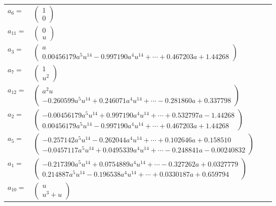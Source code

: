 \documentclass[1p]{elsarticle_modified}
\theoremstyle{definition}
\begin{document}
\begin{tabular}{m{7pt} m{180pt} m{7pt} m{180pt} }
\flushright $a_{6}=$&$\begin{pmatrix}1\\0\end{pmatrix}$ \\
\flushright $a_{11}=$&$\begin{pmatrix}0\\u\end{pmatrix}$ \\
\flushright $a_{3}=$&$\begin{pmatrix}a\\0.00456179 a^{5} u^{14}-0.997190 a^{4} u^{14}+\cdots+0.467203 a+1.44268\end{pmatrix}$ \\
\flushright $a_{7}=$&$\begin{pmatrix}1\\u^2\end{pmatrix}$ \\
\flushright $a_{12}=$&$\begin{pmatrix}a^2 u\\-0.260599 a^{5} u^{14}+0.246071 a^{4} u^{14}+\cdots-0.281860 a+0.337798\end{pmatrix}$ \\
\flushright $a_{2}=$&$\begin{pmatrix}-0.00456179 a^{5} u^{14}+0.997190 a^{4} u^{14}+\cdots+0.532797 a-1.44268\\0.00456179 a^{5} u^{14}-0.997190 a^{4} u^{14}+\cdots+0.467203 a+1.44268\end{pmatrix}$ \\
\flushright $a_{5}=$&$\begin{pmatrix}-0.257142 a^{5} u^{14}-0.262044 a^{4} u^{14}+\cdots+0.102646 a+0.158510\\-0.0457117 a^{5} u^{14}+0.0495339 a^{4} u^{14}+\cdots-0.248841 a-0.00240832\end{pmatrix}$ \\
\flushright $a_{1}=$&$\begin{pmatrix}-0.217390 a^{5} u^{14}+0.0754889 a^{4} u^{14}+\cdots-0.327262 a+0.0327779\\0.214887 a^{5} u^{14}-0.196538 a^{4} u^{14}+\cdots+0.0330187 a+0.659794\end{pmatrix}$ \\
\flushright $a_{10}=$&$\begin{pmatrix}u\\u^3+u\end{pmatrix}$ \\

\end{tabular}
\end{document}
